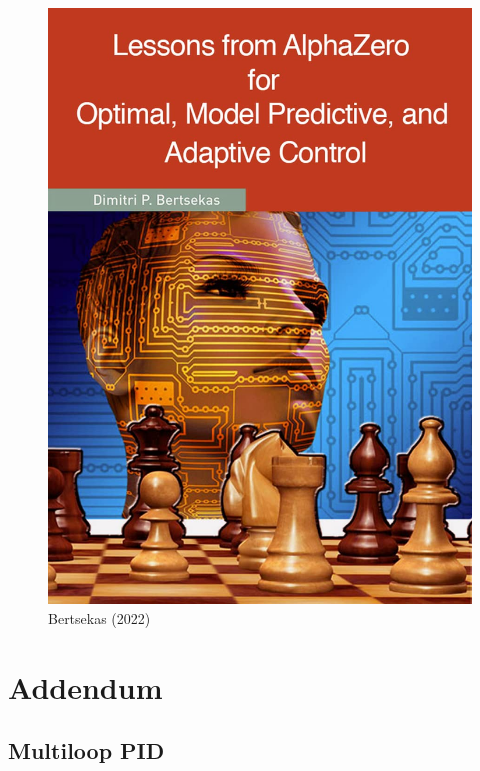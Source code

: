 \documentclass[
  letterpaper,
  DIV=11,
  numbers=noendperiod,
  oneside]{scrartcl}
\begin{document}
\begin{figure}[H]

{\centering \includegraphics{figs/alphazerobertsekas.jpg}

}

\caption{Bertsekas (2022)}

\end{figure}%

\section{Addendum}\label{addendum}

\subsection{Multiloop PID}\label{multiPID}

\subsection{}\label{section-55}
\end{document}
